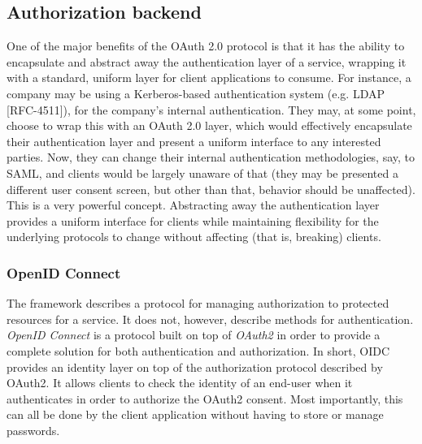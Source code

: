 \subsection{Authorization backend}
One of the major benefits of the OAuth 2.0 protocol is that it has the ability to encapsulate and abstract away the authentication layer of a service, wrapping it with a standard, uniform layer for client applications to consume. For instance, a company may be using a Kerberos-based authentication system (e.g. LDAP [RFC-4511]), for the company's internal authentication. They may, at some point, choose to wrap this with an OAuth 2.0 layer, which would effectively encapsulate their authentication layer and present a uniform interface to any interested parties. Now, they can change their internal authentication methodologies, say, to SAML, and clients would be largely unaware of that (they may be presented a different user consent screen, but other than that, behavior should be unaffected). This is a very powerful concept. Abstracting away the authentication layer provides a uniform interface for clients while maintaining flexibility for the underlying protocols to change without affecting (that is, breaking) clients.

\subsubsection{OpenID Connect}
The framework describes a protocol for managing authorization to protected resources for a service. It does not, however, describe methods for authentication. \textit{OpenID Connect} \cite{openid} is a protocol built on top of \textit{OAuth2} in order to provide a complete solution for both authentication and authorization. In short, OIDC provides an identity layer on top of the authorization protocol described by OAuth2. It allows clients to check the identity of an end-user when it authenticates in order to  authorize the OAuth2 consent. Most importantly, this can all be done by the client application without having to store or manage passwords.


